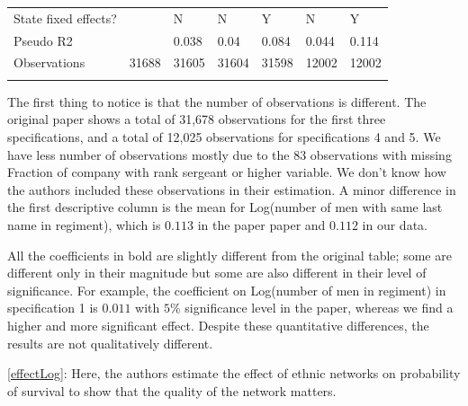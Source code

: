 \documentclass[draft.tex]{subfiles}
\begin{document}
\begin{table}
\begin{tabular}{lllllll}
State fixed effects?                               &        & N       & N       & Y       & N                                   & Y \\
Pseudo R2                                          &        & 0.038   & 0.04    & 0.084   & 0.044                               & 0.114 \\
Observations                                       & 31688  & 31605   & 31604   & 31598   & 12002                               & 12002 \\
                                                   &        &         &         &         &                                     &  \\
\end{tabular}
\end{table}

The first thing to notice is that the number of observations is different. The original paper shows a total of 31,678 observations for the first three specifications, and a total of 12,025 observations for specifications 4 and 5. We have less number of observations mostly due to the 83 observations with missing Fraction of company with rank sergeant or higher variable. We don’t know how the authors included these observations in their estimation.  A minor difference in the first descriptive column is the mean for Log(number of men with same last name in regiment), which is $0.113$ in the paper paper and $0.112$ in our data.

All the coefficients in bold are slightly different from the original table; some are different only in their magnitude but some are also different in their level of significance. For example, the coefficient on Log(number of men in regiment) in specification 1 is $0.011$ with $5\%$ significance level in the paper, whereas we find a higher and more significant effect. Despite these quantitative differences, the results are not qualitatively different.

\autoref{effectLog}: Here, the authors estimate the effect of ethnic networks on probability of survival to show that the quality of the network matters.
\end{document}
